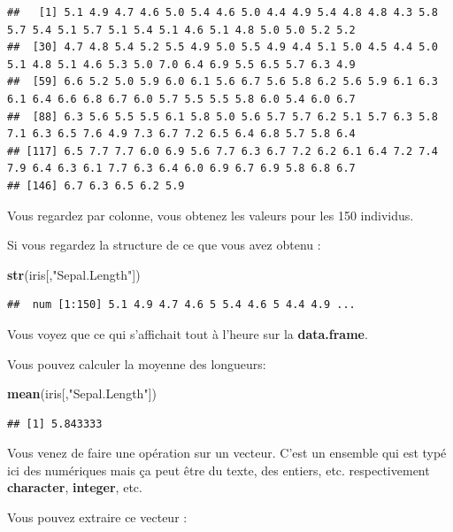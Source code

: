 \documentclass[
]{book}
\newenvironment{Shaded}{\begin{snugshade}}{\end{snugshade}}
\newcommand{\FunctionTok}[1]{\textcolor[rgb]{0.13,0.29,0.53}{\textbf{#1}}}
\newcommand{\NormalTok}[1]{#1}
\newcommand{\StringTok}[1]{\textcolor[rgb]{0.31,0.60,0.02}{#1}}
\begin{document}
\begin{verbatim}
##   [1] 5.1 4.9 4.7 4.6 5.0 5.4 4.6 5.0 4.4 4.9 5.4 4.8 4.8 4.3 5.8 5.7 5.4 5.1 5.7 5.1 5.4 5.1 4.6 5.1 4.8 5.0 5.0 5.2 5.2
##  [30] 4.7 4.8 5.4 5.2 5.5 4.9 5.0 5.5 4.9 4.4 5.1 5.0 4.5 4.4 5.0 5.1 4.8 5.1 4.6 5.3 5.0 7.0 6.4 6.9 5.5 6.5 5.7 6.3 4.9
##  [59] 6.6 5.2 5.0 5.9 6.0 6.1 5.6 6.7 5.6 5.8 6.2 5.6 5.9 6.1 6.3 6.1 6.4 6.6 6.8 6.7 6.0 5.7 5.5 5.5 5.8 6.0 5.4 6.0 6.7
##  [88] 6.3 5.6 5.5 5.5 6.1 5.8 5.0 5.6 5.7 5.7 6.2 5.1 5.7 6.3 5.8 7.1 6.3 6.5 7.6 4.9 7.3 6.7 7.2 6.5 6.4 6.8 5.7 5.8 6.4
## [117] 6.5 7.7 7.7 6.0 6.9 5.6 7.7 6.3 6.7 7.2 6.2 6.1 6.4 7.2 7.4 7.9 6.4 6.3 6.1 7.7 6.3 6.4 6.0 6.9 6.7 6.9 5.8 6.8 6.7
## [146] 6.7 6.3 6.5 6.2 5.9
\end{verbatim}

Vous regardez par colonne, vous obtenez les valeurs pour les 150 individus.

Si vous regardez la structure de ce que vous avez obtenu :

\begin{Shaded}
\begin{Highlighting}[]
\FunctionTok{str}\NormalTok{(iris[,}\StringTok{"Sepal.Length"}\NormalTok{])}
\end{Highlighting}
\end{Shaded}

\begin{verbatim}
##  num [1:150] 5.1 4.9 4.7 4.6 5 5.4 4.6 5 4.4 4.9 ...
\end{verbatim}

Vous voyez que ce qui s'affichait tout à l'heure sur la \textbf{data.frame}.

Vous pouvez calculer la moyenne des longueurs:

\begin{Shaded}
\begin{Highlighting}[]
\FunctionTok{mean}\NormalTok{(iris[,}\StringTok{"Sepal.Length"}\NormalTok{])}
\end{Highlighting}
\end{Shaded}

\begin{verbatim}
## [1] 5.843333
\end{verbatim}

Vous venez de faire une opération sur un vecteur. C'est un ensemble qui est typé
ici des numériques mais ça peut être du texte, des entiers, etc. respectivement
\textbf{character}, \textbf{integer}, etc.

Vous pouvez extraire ce vecteur :
\end{document}

